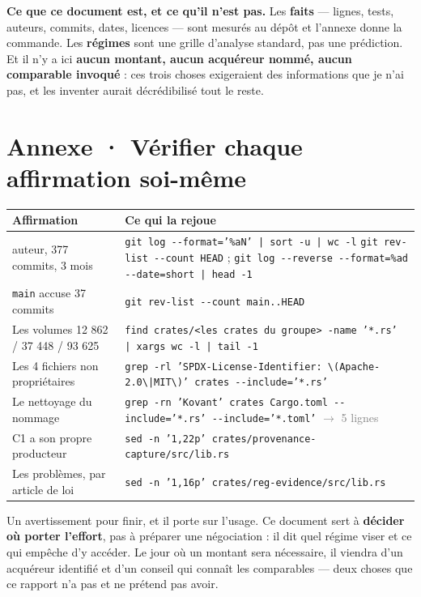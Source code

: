 \documentclass[10pt]{article}
\newcommand{\sz}[1]{\textcolor{grey}{\small\textsf{#1}}}
\newcommand{\code}[1]{\texttt{\small #1}}
\begin{document}
\begin{these}
\small\textbf{Ce que ce document est, et ce qu'il n'est pas.} Les \textbf{faits} --- lignes, tests,
auteurs, commits, dates, licences --- sont mesurés au dépôt et l'annexe donne la commande. Les
\textbf{régimes} sont une grille d'analyse standard, pas une prédiction. Et il n'y a ici
\textbf{aucun montant, aucun acquéreur nommé, aucun comparable invoqué} : ces trois choses exigeraient
des informations que je n'ai pas, et les inventer aurait décrédibilisé tout le reste.
\end{these}

\section{Annexe · Vérifier chaque affirmation soi-même}

\renewcommand{\arraystretch}{1.22}
\begin{center}\small
\begin{tabular}{@{}>{\raggedright\arraybackslash}p{5.4cm} >{\raggedright\arraybackslash}p{10.7cm}@{}}
\toprule
\textbf{Affirmation} & \textbf{Ce qui la rejoue} \\
\midrule
1 auteur, 377 commits, 3 mois &
  \code{git log -{}-format='\%aN' | sort -u | wc -l} \newline
  \code{git rev-list -{}-count HEAD} \; ; \; \code{git log -{}-reverse -{}-format=\%ad -{}-date=short | head -1} \\
\code{main} accuse 37 commits &
  \code{git rev-list -{}-count main..HEAD} \\
Les volumes 12 862 / 37 448 / 93 625 &
  \code{find crates/<les crates du groupe> -name '*.rs' | xargs wc -l | tail -1} \\
Les 4 fichiers non propriétaires &
  \code{grep -rl 'SPDX-License-Identifier: \textbackslash(Apache-2.0\textbackslash|MIT\textbackslash)' crates -{}-include='*.rs'} \\
Le nettoyage du nommage &
  \code{grep -rn 'Kovant' crates Cargo.toml -{}-include='*.rs' -{}-include='*.toml'} \sz{$\rightarrow$ 5 lignes} \\
C1 a son propre producteur &
  \code{sed -n '1,22p' crates/provenance-capture/src/lib.rs} \\
Les problèmes, par article de loi &
  \code{sed -n '1,16p' crates/reg-evidence/src/lib.rs} \\
\bottomrule
\end{tabular}
\end{center}

Un avertissement pour finir, et il porte sur l'usage. Ce document sert à \textbf{décider où porter
l'effort}, pas à préparer une négociation : il dit quel régime viser et ce qui empêche d'y accéder. Le
jour où un montant sera nécessaire, il viendra d'un acquéreur identifié et d'un conseil qui connaît les
comparables --- deux choses que ce rapport n'a pas et ne prétend pas avoir.
\end{document}
